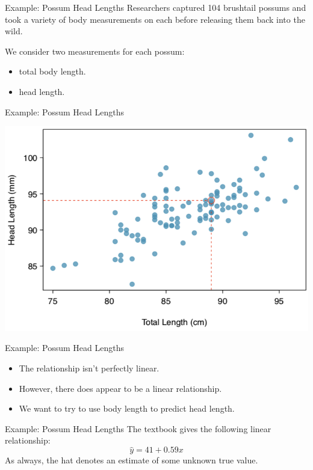 \begin{frame}{Example: Possum Head Lengths}
    Researchers captured 104 brushtail possums and took a variety of body measurements on each before releasing them back into the wild.
    
    \vspace{12pt}We consider two measurements for each possum:
    \begin{itemize}
        \item total body length.
        \item head length.
    \end{itemize}
\end{frame}

\begin{frame}{Example: Possum Head Lengths}
    \begin{center}
        \includegraphics[scale=0.35]{images/possumscatter.png}
    \end{center}
\end{frame}

\begin{frame}{Example: Possum Head Lengths}
    \begin{itemize}
        \item The relationship isn't perfectly linear.
        \item However, there does appear to be a linear relationship.
        \item We want to try to use body length to predict head length.
    \end{itemize}
\end{frame}

\begin{frame}{Example: Possum Head Lengths}
    The textbook gives the following linear relationship:
    \[
        \hat{y} = 41 + 0.59x
    \]
    As always, the hat denotes an estimate of some unknown true value. 
\end{frame}

